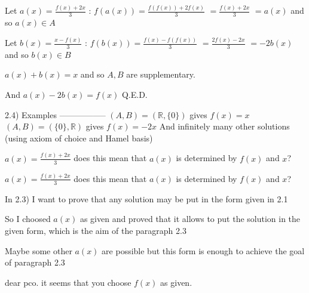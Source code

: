 \begin{solution}
Let $a(x)=\frac{f(x)+2x}3$ : $f(a(x))=\frac{f(f(x))+2f(x)}3$ $=\frac{f(x)+2x}3$ $=a(x)$ and so $a(x)\in A$

Let $b(x)=\frac{x-f(x)}3$ : $f(b(x))=\frac{f(x)-f(f(x))}3$ $=\frac{2f(x)-2x}3$ $=-2b(x)$ and so $b(x)\in B$

$a(x)+b(x)=x$ and so $A,B$ are supplementary.

And $a(x)-2b(x)=f(x)$
Q.E.D.

2.4) Examples
-----------------
$(A,B)=(\mathbb R,\{0\})$ gives $f(x)=x$
$(A,B)=(\{0\},\mathbb R)$ gives $f(x)=-2x$
And infinitely many other solutions (using axiom of choice and Hamel basis)
\end{solution}



\begin{solution}
	$a(x)=\frac{f(x)+2x}3$  
does this mean that $a(x)$ is determined by $f(x)$ and $x$?

\end{solution}



\begin{solution}
	\begin{tcolorbox}$a(x)=\frac{f(x)+2x}3$  
does this mean that $a(x)$ is determined by $f(x)$ and $x$?\end{tcolorbox}

In 2.3) I want to prove that any solution may be put in the form given in 2.1

So I choosed $a(x)$ as given and proved that it allows to put the solution in the given form, which is the aim of the paragraph 2.3

Maybe some other $a(x)$ are possible but this form is enough to achieve the goal of paragraph 2.3


\end{solution}



\begin{solution}
	dear pco. it seems that you choose $f(x)$ as given.  
\end{solution}



